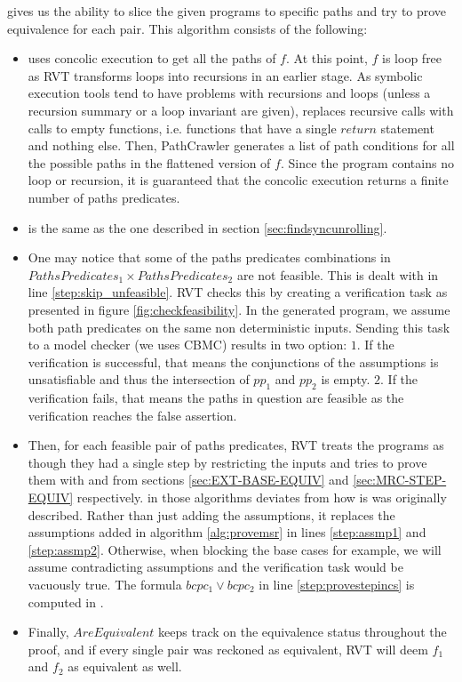  gives us the ability to slice the given programs to specific paths and try to prove equivalence for each pair. This algorithm consists of the following:
\begin{itemize}
    \item{} uses concolic execution to get all the paths of $f$. At this point, $f$ is loop free as RVT transforms loops into recursions in an earlier stage. As symbolic execution tools tend to have problems with recursions and loops (unless a recursion summary or a loop invariant are given),  replaces recursive calls with calls to empty functions, i.e. functions that have a single $return$ statement and nothing else. Then, PathCrawler \cite{10.1007/11408901_21} generates a list of path conditions for all the possible paths in the flattened version of $f$. Since the program contains no loop or recursion, it is guaranteed that the concolic execution returns a finite number of paths predicates. 
    \item{} is the same as the one described in section \ref{sec:findsyncunrolling}.
    \item One may notice that some of the paths predicates combinations in $PathsPredicates_1 \times PathsPredicates_2$ are not feasible. This is dealt with in line \ref{step:skip_unfeasible}. RVT checks this by creating a verification task as presented in figure \ref{fig:checkfeasibility}. In the generated program, we assume both path predicates on the same non deterministic inputs. Sending this task to a model checker (we uses CBMC) results in two option: $1.$ If the verification is successful, that means the conjunctions of the assumptions is unsatisfiable and thus the intersection of $pp_1$ and $pp_2$ is empty. $2.$ If the verification fails, that means the paths in question are feasible as the verification reaches the false assertion.
    \item Then, for each feasible pair of paths predicates, RVT treats the programs as though they had a single step by restricting the inputs and tries to prove them with  and  from sections \ref{sec:EXT-BASE-EQUIV} and \ref{sec:MRC-STEP-EQUIV} respectively.  in those algorithms deviates from how is was originally described. Rather than just adding the assumptions, it replaces the assumptions added in algorithm \ref{alg:provemsr} in lines \ref{step:assmp1} and \ref{step:assmp2}. Otherwise, when blocking the base cases for example, we will assume contradicting assumptions and the verification task would be vacuously true. The formula $bcpc_1\lor bcpc_2$ in line \ref{step:provestepincs} is computed in . 
    \item Finally, $AreEquivalent$ keeps track on the equivalence status throughout the proof, and if every single pair was reckoned as equivalent, RVT will deem $f_1$ and $f_2$ as equivalent as well. 
\end{itemize}

